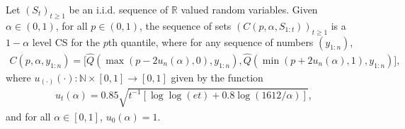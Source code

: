 




\begin{theorem}
    Let $(S_t)_{t \geq 1}$ be an i.i.d. sequence of $\mathbb{R}$ valued random variables. Given $\alpha \in (0,1)$, for all $p \in (0,1)$, the sequence of sets $(C(p,\alpha,S_{1:t}))_{t \geq 1}$ is a $1-\alpha$ level CS for the $p$th quantile, where for any sequence of numbers $(y_{1:n}) $, %
        \begin{multline}
        C(p, \alpha, y_{1:n}) = \bigg[ \widehat{Q}(\max(p-2u_{n}(\alpha),0), y_{1:n}), \widehat{Q}(\min(p+2u_{n}(\alpha),1), y_{1:n}) \bigg],
        \label{eq:cs}
   \end{multline}
    where $u_{(\cdot)}(\cdot): \mathbb{N} \times [0,1] \to [0,1]$ given by the function 
    \begin{align}
       u_t(\alpha) = 0.85 \sqrt{t^{-1}[\log\log(et) + 0.8 \log(1612/\alpha)]},
       \label{eqn:defn_confidence_width_ut}
    \end{align}
    and for all $\alpha \in [0,1]$, $u_0(\alpha) = 1$.
\end{theorem}





